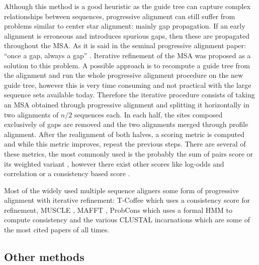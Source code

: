 \documentclass[
  11pt,
  twoside,
  BCOR=10mm,
  listof=totoc]{scrbook}
\begin{document}
Although this method is a good heuristic as the guide tree can capture complex relationships between sequences, progressive alignment can still suffer from problems similar to center star alignment: mainly gap propagation. If an early alignment is erroneous and introduces spurious gaps, then these are propagated throughout the MSA. As it is said in the seminal progressive alignment paper: ``once a gap, always a gap'' \autocite{fengProgressiveSequenceAlignment1987}. Iterative refinement of the MSA \autocite{russellMultipleSequenceAlignment2014} was proposed as a solution to this problem. A possible approach is to recompute a guide tree from the alignment and run the whole progressive alignment procedure on the new guide tree, however this is very time consuming and not practical with the large sequence sets available today. Therefore the iterative procedure consists of taking an MSA obtained through progressive alignment and splitting it horizontally in two alignments of \(n/2\) sequences each. In each half, the sites composed exclusively of gaps are removed and the two alignments merged through profile alignment. After the realignment of both halves, a scoring metric is computed and while this metric improves, repeat the previous steps. There are several of these metrics, the most commonly used is the probably the sum of pairs score \autocite{altschulGapCostsMultiple1989} or its weighted variant \autocite{altschulWeightsDataRelated1989}, however there exist other scores like log-odds and correlation \autocite{edgarComparisonScoringFunctions2004} or a consistency based score \autocite{notredameCOFFEEObjectiveFunction1998}.

Most of the widely used multiple sequence aligners some form of progressive alignment with iterative refinement: T-Coffee \autocite{notredameTcoffeeNovelMethod2000} which uses a consistency score for refinement, MUSCLE \autocite{edgarMUSCLEMultipleSequence2004a,edgarMUSCLEMultipleSequence2004}, MAFFT \autocite{katohMAFFTNovelMethod2002}, ProbCons \autocite{doProbConsProbabilisticConsistencybased2005} which uses a formal HMM to compute consistency and the various CLUSTAL incarnations \autocite{thompsonCLUSTALImprovingSensitivity1994,thompsonCLUSTALWindowsInterface1997,sieversFastScalableGeneration2011} which are some of the most cited papers of all times.

\hypertarget{other-methods}{%
\subsection{Other methods}\label{other-methods}}
\end{document}

